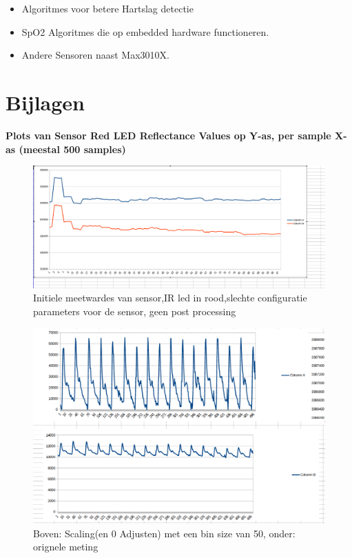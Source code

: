 \documentclass[11pt]{article}
\begin{document}
\begin{itemize}
	\item Algoritmes voor betere Hartslag detectie
	\item SpO2 Algoritmes die op embedded  hardware functioneren.
	\item Andere Sensoren naast Max3010X.
\end{itemize}

    
    \pagebreak

    \section{Bijlagen}\label{sec:bijlagen}
    \textbf{Plots van Sensor Red LED Reflectance Values op Y-as, per sample X-as (meestal 500 samples)}

\begin{figure}[h]
	\centering
	\caption{Initiele meetwardes van sensor,IR led in rood,slechte configuratie parameters voor de sensor, geen post processing}
    \includegraphics[height=0.4\textheight]{Images/r1.png}
\end{figure}

\begin{figure}
	\caption{Boven: Scaling(en 0 Adjusten) met een bin size van 50, onder: orignele meting}
   \hfill\includegraphics[height=0.75\textheight]{Images/r2.png}
\end{figure}
\end{document}
